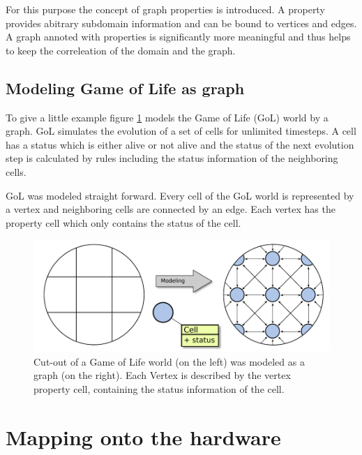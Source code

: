 For this purpose the concept of graph properties is introduced. A
property provides abitrary subdomain information and can be bound to
vertices and edges. A graph annoted with properties is significantly
more meaningful and thus helps to keep the correleation of the domain
and the graph.

\subsection{Modeling Game of Life as graph}
To give a little example figure \ref{fig:gol} models the Game of Life
(GoL) \cite{ref:gol} world by a graph. GoL simulates the evolution of
a set of cells for unlimited timesteps. A cell has a status which is
either alive or not alive and the status of the next evolution step is
calculated by rules including the status information of the
neighboring cells.

GoL was modeled straight forward.  Every cell of the GoL world is
represented by a vertex and neighboring cells are connected by an
edge. Each vertex has the property cell which only contains the status
of the cell.

\begin{figure}[H]
  \centering \includegraphics[width=\textwidth]{graphics/30_gol}
  \caption{Cut-out of a Game of Life world (on the left) was modeled as a graph (on
    the right). Each Vertex is described by the vertex property cell, 
    containing the status information of the cell.}
  \label{fig:gol}
\end{figure}



\section{Mapping onto the hardware}

